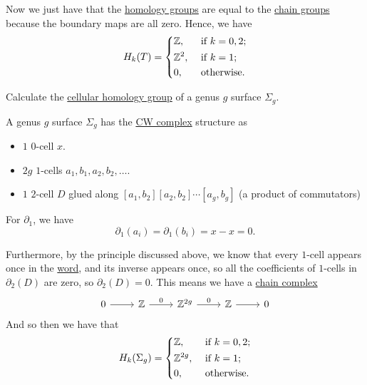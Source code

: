 \begin{explanation}
	Now we just have that the \hyperref[def:cellular-homology-group]{homology groups} are equal to the \hyperref[def:cellular-chain-complex]{chain groups} because the boundary maps are all zero.
	Hence, we have
	\[
		H_{k}(T) = \begin{dcases}
			\mathbb{\MakeUppercase{z}} ,     & \text{ if } k = 0, 2 ; \\
			\mathbb{\MakeUppercase{z}} ^{2}, & \text{ if } k = 1;     \\
			0,                               & \text{ otherwise}.
		\end{dcases}
	\]
\end{explanation}

\begin{eg}
	Calculate the \hyperref[def:cellular-homology-group]{cellular homology group} of a genus \(g\) surface \(\Sigma _g\).
\end{eg}
\begin{explanation}
	A genus \(g\) surface \(\Sigma_g\) has the \hyperref[def:CW-Complex]{CW complex} structure as
	\begin{itemize}
		\item \(1\) \(0\)-cell \(x\).
		\item \(2g\) \(1\)-cells \(a_1, b_1, a_2, b_2, \ldots\).
		\item \(1\) \(2\)-cell \(D\) glued along \([a_1, b_2][a_2, b_2]\cdots[a_g, b_g]\) (a product of commutators)
	\end{itemize}

	For \(\partial _1\), we have
	\[
		\partial_1(a_i) = \partial_1(b_i) = x - x = 0.
	\]

	Furthermore, by the principle discussed above, we know that every \(1\)-cell appears once in the \hyperref[def:word]{word}, and its inverse appears once,
	so all the coefficients of \(1\)-cells in \(\partial_2(D)\) are zero, so \(\partial_2(D) = 0\). This means we have a \hyperref[def:cellular-chain-complex]{chain complex}
	\[
		\begin{tikzcd}
			0 & {\mathbb{Z}} & {\mathbb{Z}^{2g}} & {\mathbb{Z}} & 0
			\arrow[from=1-1, to=1-2]
			\arrow["0", from=1-2, to=1-3]
			\arrow["0", from=1-3, to=1-4]
			\arrow[from=1-4, to=1-5]
		\end{tikzcd}
	\]
	And so then we have that
	\[
		H_k(\Sigma _{g} ) = \begin{dcases}
			\mathbb{\MakeUppercase{z}} ,      & \text{ if } k = 0, 2 ; \\
			\mathbb{\MakeUppercase{z}} ^{2g}, & \text{ if } k = 1;     \\
			0,                                & \text{ otherwise}.
		\end{dcases}
	\]
\end{explanation}

